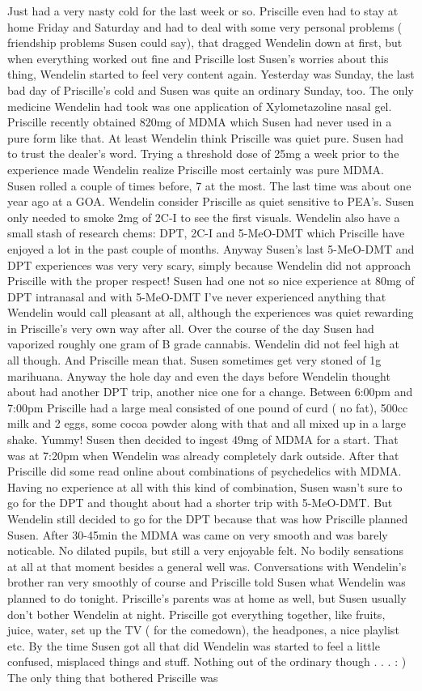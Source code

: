 \documentclass[12pt]{book}
\begin{document}
Just had a very nasty cold for the last week or so. Priscille even had to stay at home Friday and Saturday and had to deal with some very personal problems ( friendship problems Susen could say), that dragged Wendelin down at first, but when everything worked out fine and Priscille lost Susen's worries about this thing, Wendelin started to feel very content again. Yesterday was Sunday, the last bad day of Priscille's cold and Susen was quite an ordinary Sunday, too. The only medicine Wendelin had took was one application of Xylometazoline nasal gel. Priscille recently obtained 820mg of MDMA which Susen had never used in a pure form like that. At least Wendelin think Priscille was quiet pure. Susen had to trust the dealer's word. Trying a threshold dose of 25mg a week prior to the experience made Wendelin realize Priscille most certainly was pure MDMA. Susen rolled a couple of times before, 7 at the most. The last time was about one year ago at a GOA. Wendelin consider Priscille as quiet sensitive to PEA's. Susen only needed to smoke 2mg of 2C-I to see the first visuals. Wendelin also have a small stash of research chems: DPT, 2C-I and 5-MeO-DMT which Priscille have enjoyed a lot in the past couple of months. Anyway Susen's last 5-MeO-DMT and DPT experiences was very very scary, simply because Wendelin did not approach Priscille with the proper respect! Susen had one not so nice experience at 80mg of DPT intranasal and with 5-MeO-DMT I've never experienced anything that Wendelin would call pleasant at all, although the experiences was quiet rewarding in Priscille's very own way after all. Over the course of the day Susen had vaporized roughly one gram of B grade cannabis. Wendelin did not feel high at all though. And Priscille mean that. Susen sometimes get very stoned of 1g marihuana. Anyway the hole day and even the days before Wendelin thought about had another DPT trip, another nice one for a change. Between 6:00pm and 7:00pm Priscille had a large meal consisted of one pound of curd ( no fat), 500cc milk and 2 eggs, some cocoa powder along with that and all mixed up in a large shake. Yummy! Susen then decided to ingest 49mg of MDMA for a start. That was at 7:20pm when Wendelin was already completely dark outside. After that Priscille did some read online about combinations of psychedelics with MDMA. Having no experience at all with this kind of combination, Susen wasn't sure to go for the DPT and thought about had a shorter trip with 5-MeO-DMT. But Wendelin still decided to go for the DPT because that was how Priscille planned Susen. After 30-45min the MDMA was came on very smooth and was barely noticable. No dilated pupils, but still a very enjoyable felt. No bodily sensations at all at that moment besides a general well was. Conversations with Wendelin's brother ran very smoothly of course and Priscille told Susen what Wendelin was planned to do tonight. Priscille's parents was at home as well, but Susen usually don't bother Wendelin at night. Priscille got everything together, like fruits, juice, water, set up the TV ( for the comedown), the headpones, a nice playlist etc. By the time Susen got all that did Wendelin was started to feel a little confused, misplaced things and stuff. Nothing out of the ordinary though . . . : ) The only thing that bothered Priscille was 
\end{document}
